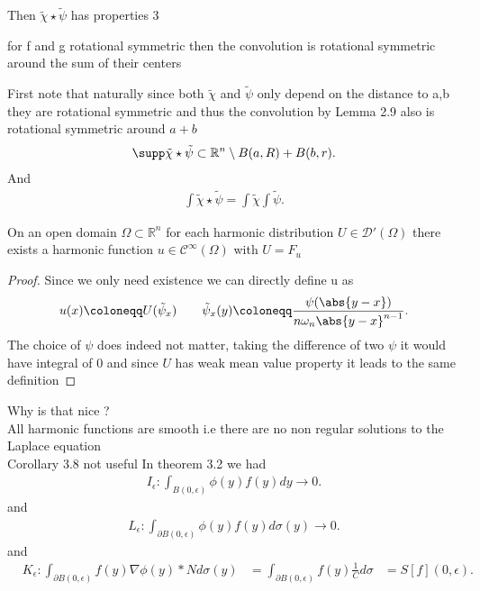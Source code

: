 Then $\tilde{\chi } \star  \tilde{\psi}  $ has properties 3
\begin{lemma}[2.9]
  for f and g rotational symmetric  then the convolution is rotational symmetric around  the sum of their centers
\end{lemma}
First note that naturally since both $\tilde{\chi } $ and $\tilde{\psi} $ only depend on the distance to a,b they are 
rotational symmetric and thus the convolution by Lemma 2.9 also is rotational symmetric around $a+b$
\begin{align*}
  \supp  \tilde{\chi } \star  \tilde{\psi} \subset  \mathbb{R}^{n}  \setminus B(a,R) + B(b,r)
.\end{align*}
And 
\begin{align*}
  \int \tilde{\chi } \star \tilde{\psi} = \int \tilde{\chi }  \int \tilde{\psi} 
.\end{align*}
\begin{lemma}
 On an open domain $\Omega \subset  \mathbb{R}^{n} $  for each harmonic distribution $U \in  \mathcal{D}'(\Omega )$ there exists a 
 harmonic function $u \in  \mathcal{C}^{\infty}(\Omega ) $ with $U = F_u$
\end{lemma}
\begin{proof}
 Since we only need existence we can directly define u as 
 \begin{align*}
   u(x) \coloneqq  U(\tilde{\psi}_x) \qquad \tilde{\psi}_x (y) \coloneqq  \frac{\psi(\abs{y-x})}{n \omega_n \abs{y-x}^{n-1} }
 .\end{align*}
 The choice of $\psi$ does indeed not matter, taking the difference of two $\psi$ it would have integral of 0 
 and since $U$ has weak mean value property it leads to the same definition
\end{proof}
Why is that nice ? \\[1ex]
All harmonic functions are smooth i.e there are no non regular solutions to the Laplace equation \\[1ex]
Corollary 3.8 not useful
\newpage
In theorem 3.2 we had 
\begin{align*}
  I_\epsilon : \int_{B(0,\epsilon)} \phi (y)f(y) dy \to 0
.\end{align*}
and 
\begin{align*}
  L_{\epsilon} : \int_{\partial B(0,\epsilon )} \phi(y)f(y) d\sigma(y) \to 0
.\end{align*}
and 
\begin{align*}
  &K_{\epsilon} : \int_{\partial B(0,\epsilon )} f(y)\nabla \phi(y)*N  d\sigma(y) 
  &= \int_{\partial B(0,\epsilon)} f(y) \frac{1}{C} d\sigma 
  &= S[f](0,\epsilon ) 
.\end{align*}

































